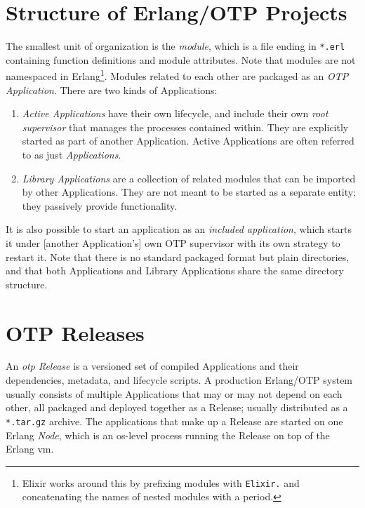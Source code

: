 \section{Structure of Erlang/OTP Projects}

The smallest unit of organization is the \emph{module}, which is a file ending in \lstinline|*.erl| containing function definitions and module attributes. Note that modules are not namespaced in Erlang\footnote{Elixir works around this by prefixing modules with \lstinline|Elixir.| and concatenating the names of nested modules with a period.}. Modules related to each other are packaged as an \emph{OTP Application}. There are two kinds of Applications:

\begin{enumerate}
  \item \emph{Active Applications} have their own lifecycle, and include their own \emph{root supervisor} that manages the processes contained within. They are explicitly started as part of another Application. Active Applications are often referred to as just \emph{Applications}.\cite{logan:otp}

  \item \emph{Library Applications} are a collection of related modules that can be imported by other Applications. They are not meant to be started as a separate entity; they passively provide functionality.
\end{enumerate}


It is also possible to start an application as an \emph{included application}, which starts it under [another Application's] own OTP supervisor with its own strategy to restart it.\cite{ferd:anger} Note that there is no standard packaged format but plain directories, and that both Applications and Library Applications share the same directory structure.


\section{OTP Releases}
An \emph{\acrshort{otp} Release} is a versioned set of compiled Applications and their dependencies, metadata, and lifecycle scripts. A production Erlang/OTP system usually consists of multiple Applications that may or may not depend on each other, all packaged and deployed together as a Release; usually distributed as a \lstinline|*.tar.gz| archive. The applications that make up a Release are started on one Erlang \emph{Node}, which is an \acrshort{os}-level process running the Release on top of the Erlang \acrshort{vm}.

